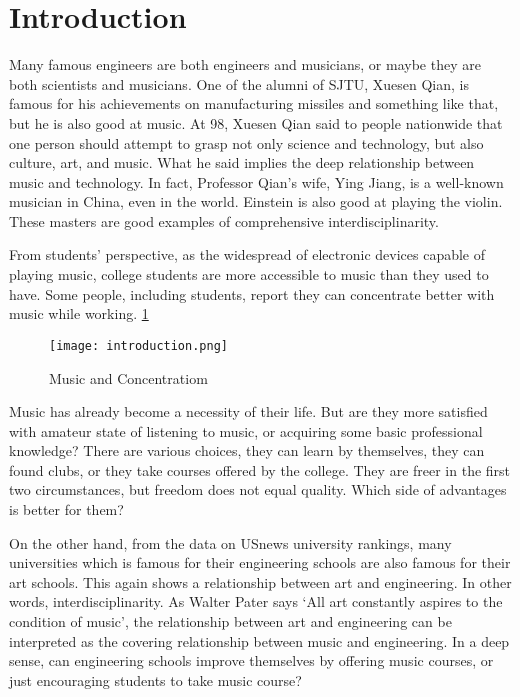 \section{Introduction}
Many famous engineers are both engineers and musicians, or maybe they are both scientists and musicians. One of the alumni of SJTU, Xuesen Qian, is famous for his achievements on manufacturing missiles and something like that, but he is also good at music. At 98, Xuesen Qian said to people nationwide that one person should attempt to grasp not only science and technology, but also culture, art, and music. What he said implies the deep relationship between music and technology. In fact, Professor Qian’s wife, Ying Jiang, is a well-known musician in China, even in the world. Einstein is also good at playing the violin. These masters are good examples of comprehensive interdisciplinarity.\par
From students’ perspective, as the widespread of electronic devices capable of playing music, college students are more accessible to music than they used to have. Some people, including students, report they can concentrate better with music while working. \ref{Music and Concentration}

\begin{figure}
\centering
\texttt{[image: introduction.png]}
\label{Music and Concentration}
\caption{Music and Concentratiom}
\end{figure}

Music has already become a necessity of their life. But are they more satisfied with amateur state of listening to music, or acquiring some basic professional knowledge? There are various choices, they can learn by themselves, they can found clubs, or they take courses offered by the college. They are freer in the first two circumstances, but freedom does not equal quality. Which side of advantages is better for them?\par
On the other hand, from the data on USnews university rankings, many universities which is famous for their engineering schools are also famous for their art schools. This again shows a relationship between art and engineering. In other words, interdisciplinarity. As Walter Pater says ‘All art constantly aspires to the condition of music’, the relationship between art and engineering can be interpreted as the covering relationship between music and engineering. In a deep sense, can engineering schools improve themselves by offering music courses, or just encouraging students to take music course?\par
